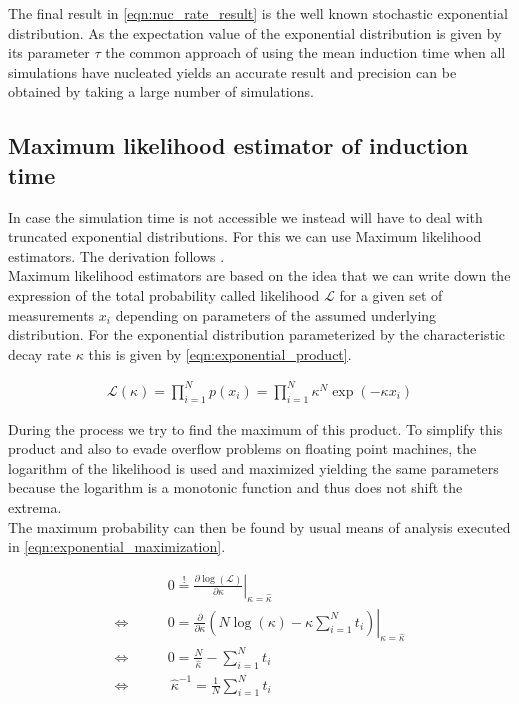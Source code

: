 The final result in \autoref{eqn:nuc_rate_result} is the well known stochastic exponential distribution. As the expectation value of the exponential distribution is given by its parameter $\tau$ the common approach of using the mean induction time when all simulations have nucleated yields an accurate result and precision can be obtained by taking a large number of simulations.\\


\subsection{Maximum likelihood estimator of induction time}
\label{sec:ml_estimator}
In case the simulation time is not accessible we instead will have to deal with truncated exponential distributions. For this we can use Maximum likelihood estimators. The derivation follows .\\

Maximum likelihood estimators are based on the idea that we can write down the expression of the total probability called likelihood $\mathcal{L}$ for a given set of measurements $x_i$ depending on parameters of the assumed underlying distribution. For the exponential distribution parameterized by the characteristic decay rate $\kappa$ this is given by \autoref{eqn:exponential_product}.

\begin{align}
\label{eqn:exponential_product}
\mathcal{L}(\kappa) = \prod_{i=1}^N p(x_i) = \prod_{i=1}^N \kappa^N \exp\left( - \kappa x_i \right ) 
\end{align}

During the process we try to find the maximum of this product. To simplify this product and also to evade overflow problems on floating point machines, the logarithm of the likelihood is used and maximized yielding the same parameters because the logarithm is a monotonic function and thus does not shift the extrema.\\
The maximum probability can then be found by usual means of analysis executed in \autoref{eqn:exponential_maximization}.

\begin{align}
\label{eqn:exponential_maximization}
& 0 \stackrel{!}{=} \left. \frac{\partial \log (\mathcal{L})}{\partial \kappa} \right|_{\kappa=\hat{\kappa}}\\
\Leftrightarrow \qquad  &0 = \left. \frac{\partial}{\partial \kappa} \left( N \log(\kappa) - \kappa \sum_{i=1}^N t_i \right)  \right|_{\kappa=\hat{\kappa}} \\
\Leftrightarrow \qquad &0 = \frac{N}{\hat{\kappa}} - \sum_{i=1}^N t_i \\
\Leftrightarrow  \qquad & \!\!\!\!\!\!\!\!\: \hat{\kappa}^{-1} = \frac{1}{N} \sum_{i=1}^N t_i  
\end{align}

